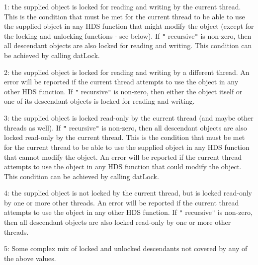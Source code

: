 \documentclass[twoside,11pt]{starlink}
\begin{document}
{{       1: the supplied object is locked for reading and writing by the
          current thread. This is the condition that must be met for the current
          thread to be able to use the supplied object in any HDS function
          that might modify the object (except for the locking and unlocking
          functions - see below). If \texttt{"} recursive\texttt{"}  is non-zero, then all
          descendant objects are also locked for reading and writing. This
          condition can be achieved by calling datLock.

       2: the supplied object is locked for reading and writing by a different
          thread. An error will be reported if the current thread attempts to
          use the object in any other HDS function. If \texttt{"} recursive\texttt{"}  is non-zero,
          then either the object itself or one of its descendant objects is
          locked for reading and writing.

       3: the supplied object is locked read-only by the current thread
          (and maybe other threads as well). If \texttt{"} recursive\texttt{"}  is non-zero,
          then all descendant objects are also locked read-only by the
          current thread. This is the condition that must be met for the
          current thread to be able to use the supplied object in any HDS
          function that cannot modify the object. An error will be
          reported if the current thread attempts to use the object in any
          HDS function that could modify the object. This condition can be
          achieved by calling datLock.

       4: the supplied object is not locked by the current thread, but is
          locked read-only by one or more other threads. An error will be
          reported if the current thread attempts to use the object in any
          other HDS function. If \texttt{"} recursive\texttt{"}   is non-zero, then all
          descendant objects are also locked read-only by one or more
          other threads.

       5: Some complex mix of locked and unlocked descendants not covered by
          any of the above values.
   }
}
\end{document}
